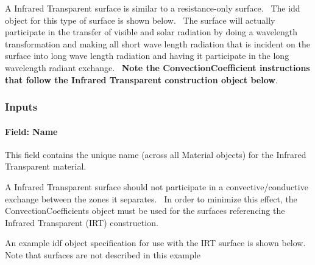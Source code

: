 A Infrared Transparent surface is similar to a resistance-only surface.~ The idd object for this type of surface is shown below.~ The surface will actually participate in the transfer of visible and solar radiation by doing a wavelength transformation and making all short wave length radiation that is incident on the surface into long wave length radiation and having it participate in the long wavelength radiant exchange.~ \textbf{Note the ConvectionCoefficient instructions that follow the Infrared Transparent construction object below}.

\subsubsection{Inputs}\label{inputs-2-040}

\paragraph{Field: Name}\label{field-name-2-037}

This field contains the unique name (across all Material objects) for the Infrared Transparent material.

A Infrared Transparent surface should not participate in a convective/conductive exchange between the zones it separates.~ In order to minimize this effect, the ConvectionCoefficients object must be used for the surfaces referencing the Infrared Transparent (IRT) construction.

An example idf object specification for use with the IRT surface is shown below. Note that surfaces are not described in this example

